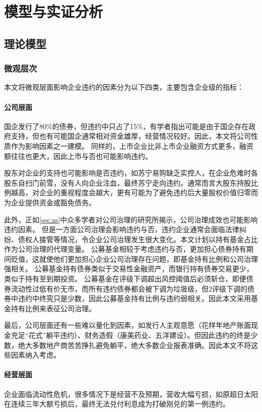 
\chapter{模型与实证分析}

\section{理论模型}
\subsection{微观层次}
本文将微观层面影响企业违约的因素分为以下四类，主要包含企业级的指标：
\subsubsection{公司层面}

国企发行了80\%的债券，但违约中只占了15\%，有学者指出可能是由于国企存在政府支持\cite{mo2021china}，但也有可能国企通常相对资金雄厚，经营情况较好。因此，本文将公司性质作为影响因素之一建模。
同样的，上市企业比非上市企业融资方式更多，融资额往往也更大，因此上市与否也可能影响违约。

股东对企业的支持也可能影响是否违约，如苏宁易购缺乏实控人，在企业危难时各股东自扫门前雪，没有人向企业注血，最终苏宁走向违约。通常而言大股东持股比例越高，对企业的重视程度会越大，更有可能为了避免违约后大量股权价值归零而为企业提供资金或豁免债务。

此外，正如\ref{sec:zs}中众多学者对公司治理的研究所揭示，公司治理成效也可能影响违约因素。
但是一方面公司治理会影响违约与否，违约企业通常会面临法律纠纷、债权人接管等情况，令企业公司治理发生很大变化。本文计划以持有基金占比作为公司治理的代理变量。
公募基金相较于考虑违约与否，更加担心债券持有期间贬值，这就使他们更加担心企业公司治理存在问题，即基金持有比例和公司治理强相关。
公募基金持有债券类似于交易性金融资产，而银行持有债券交易更少，类似于持有至到期投资。
公募基金在评级下调超出风控阈值后必须斩仓，即便债券流动性过低有价无市，而所有违约债券都会被下调为垃圾级，但2评级下调的债券中违约中终究只是少数，因此公募基金持有比例与违约弱相关。因此本文采用基金持有比例来表征公司治理。

最后，公司层面还有一些难以量化到因素，如发行人主观意愿（花样年地产账面现金充足“花式”躺平违约）、财务造假（康美药业、五洋建设）。但因此违约的终是少数，绝大多数地产商苦苦挣扎避免躺平，绝大多数企业报表准确。因此本文不将这些因素纳入考虑。
\subsubsection{经营层面}
企业面临流动性危机，很多情况下是经营不及预期，营收大幅亏损，如原超日太阳在连续三年大额亏损后，最终无法兑付利息成为打破刚兑的第一例违约。

